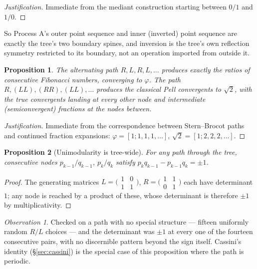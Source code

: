 \documentclass[10pt,a4paper]{article}
\theoremstyle{plain}
\newtheorem{proposition}{Proposition}
\theoremstyle{definition}
\theoremstyle{remark}
\newtheorem{observation}{Observation}
\begin{document}
\begin{proof}[Justification]
Immediate from the mediant construction starting between $0/1$ and $1/0$.
\end{proof}

So Process A's outer point sequence and inner (inverted) point sequence are exactly the tree's two boundary spines, and inversion is the tree's own reflection symmetry restricted to its boundary, not an operation imported from outside it.

\begin{proposition}
\label{prop:sb-phi}
The alternating path $R,L,R,L,\ldots$ produces exactly the ratios of consecutive Fibonacci numbers, converging to $\varphi$. The path $R,(LL),(RR),(LL),\ldots$ produces the classical Pell convergents to $\sqrt2$, with the true convergents landing at every other node and intermediate (semiconvergent) fractions at the nodes between.
\end{proposition}

\begin{proof}[Justification]
Immediate from the correspondence between Stern--Brocot paths and continued fraction expansions: $\varphi=[1;1,1,1,\ldots]$, $\sqrt2=[1;2,2,2,\ldots]$.
\end{proof}

\begin{proposition}[Unimodularity is tree-wide]
\label{prop:sb-uni}
For any path through the tree, consecutive nodes $p_{k-1}/q_{k-1}$, $p_k/q_k$ satisfy $p_kq_{k-1}-p_{k-1}q_k=\pm1$.
\end{proposition}

\begin{proof}
The generating matrices $L=\bigl(\begin{smallmatrix}1&0\\1&1\end{smallmatrix}\bigr)$, $R=\bigl(\begin{smallmatrix}1&1\\0&1\end{smallmatrix}\bigr)$ each have determinant $1$; any node is reached by a product of these, whose determinant is therefore $\pm1$ by multiplicativity.
\end{proof}

\begin{observation}
Checked on a path with no special structure --- fifteen uniformly random $R/L$ choices --- and the determinant was $\pm1$ at every one of the fourteen consecutive pairs, with no discernible pattern beyond the sign itself. Cassini's identity (\S\ref{sec:cassini}) is the special case of this proposition where the path is periodic.
\end{observation}
\end{document}
